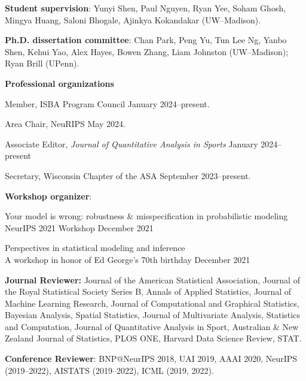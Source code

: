 \documentclass[margin]{res}
\begin{document}
\begin{resume}
\textbf{Student supervision}: Yunyi Shen, Paul Nguyen, Ryan Yee, Soham Ghosh, Mingya Huang, Saloni Bhogale, Ajinkya Kokandakar (UW--Madison).

\textbf{Ph.D. dissertation committee}: Chan Park, Peng Yu, Tun Lee Ng, Yanbo Shen, Kehui Yao, Alex Hayes, Bowen Zhang, Liam Johnston (UW--Madison); Ryan Brill (UPenn).

\textbf{Professional organizations}

Member, ISBA Program Council \hfill January 2024--present.

Area Chair, NeuRIPS \hfill May 2024.

Associate Editor, \textit{Journal of Quantitative Analysis in Sports} \hfill January 2024--present

Secretary, Wisconsin Chapter of the ASA \hfill September 2023--present.


\textbf{Workshop organizer}: 

Your model is wrong: robustness \& misspecification in probabilistic modeling \\
NeurIPS 2021 Workshop \hfill December 2021

Perspectives in statistical modeling and inference \\
A workshop in honor of Ed George's 70th birthday \hfill December 2021


\textbf{Journal Reviewer:} Journal of the American Statistical Association, Journal of the Royal Statistical Society Series B, Annals of Applied Statistics, Journal of Machine Learning Research, Journal of Computational and Graphical Statistics, Bayesian Analysis, Spatial Statistics, Journal of Multivariate Analysis, Statistics and Computation, Journal of Quantitative Analysis in Sport, Australian \& New Zealand Journal of Statistics, PLOS ONE, Harvard Data Science Review, STAT. 

\textbf{Conference Reviewer}: BNP@NeurIPS 2018, UAI 2019, AAAI 2020,  NeurIPS (2019--2022), AISTATS (2019--2022), ICML (2019, 2022).
\end{resume} 
\end{document}
